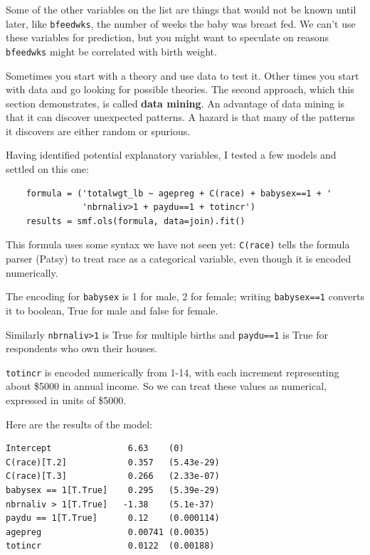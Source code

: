 \documentclass[12pt]{book}
\begin{document}
Some of the other variables on the list are things that would not
be known until later, like {\tt bfeedwks}, the number of weeks
the baby was breast fed.  We can't use these variables for prediction,
but you might want to speculate on reasons
{\tt bfeedwks} might be correlated with birth weight.

Sometimes you start with a theory and use data to test it.  Other
times you start with data and go looking for possible theories.
The second approach, which this section demonstrates, is
called {\bf data mining}.  An advantage of data mining is that it
can discover unexpected patterns.  A hazard is that many of the
patterns it discovers are either random or spurious.

Having identified potential explanatory variables, I tested a few
models and settled on this one:

\begin{verbatim}
    formula = ('totalwgt_lb ~ agepreg + C(race) + babysex==1 + '
               'nbrnaliv>1 + paydu==1 + totincr')
    results = smf.ols(formula, data=join).fit()
\end{verbatim}

This formula uses some syntax we have not seen yet:
{\tt C(race)} tells the formula parser (Patsy) to treat race as a
categorical variable, even though it is encoded numerically.

The encoding for {\tt babysex} is 1 for male, 2 for female; writing
{\tt babysex==1} converts it to boolean, True for male and false for
female.

Similarly {\tt nbrnaliv>1} is True for multiple births and 
{\tt paydu==1} is True for respondents who own their houses.

{\tt totincr} is encoded numerically from 1-14, with each increment
representing about \$5000 in annual income.  So we can treat these
values as numerical, expressed in units of \$5000.

Here are the results of the model:

\begin{verbatim}
Intercept               6.63    (0)
C(race)[T.2]            0.357   (5.43e-29)
C(race)[T.3]            0.266   (2.33e-07)
babysex == 1[T.True]    0.295   (5.39e-29)
nbrnaliv > 1[T.True]   -1.38    (5.1e-37)
paydu == 1[T.True]      0.12    (0.000114)
agepreg                 0.00741 (0.0035)
totincr                 0.0122  (0.00188)
\end{verbatim}
\end{document}
